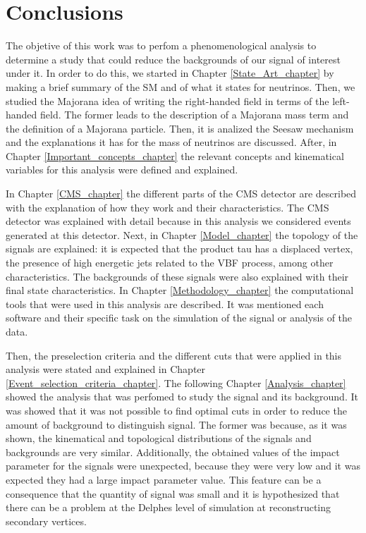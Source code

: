 \chapter{Conclusions} 
\label{Conclusion_chapter}

The objetive of this work was to perfom a phenomenological analysis to determine a study that could reduce the backgrounds of our signal of interest under it. In order to do this, we started in Chapter \ref{State_Art_chapter} by making a brief summary of the SM and of what it states for neutrinos. Then, we studied the Majorana idea of writing the right-handed field in terms of the left-handed field. The former leads to the description of a Majorana mass term and the definition of a Majorana particle. Then, it is analized the Seesaw mechanism and the explanations it has for the mass of neutrinos are discussed. After, in Chapter \ref{Important_concepts_chapter} the relevant concepts and kinematical variables for this analysis were defined and explained.

In Chapter \ref{CMS_chapter} the different parts of the CMS detector are described with the explanation of how they work and their characteristics. The CMS detector was explained with detail because in this analysis we considered events generated at this detector. Next, in Chapter \ref{Model_chapter} the topology of the signals are explained: it is expected that the product tau has a displaced vertex, the presence of high energetic jets related to the VBF process, among other characteristics. The backgrounds of these signals were also explained with their final state characteristics. In Chapter \ref{Methodology_chapter} the computational tools that were used in this analysis are described. It was mentioned each software and their specific task on the simulation of the signal or analysis of the data.  

Then, the preselection criteria and the different cuts that were applied in this analysis were stated and explained in Chapter \ref{Event_selection_criteria_chapter}. The following Chapter \ref{Analysis_chapter} showed the analysis that was perfomed to study the signal and its background. It was showed that it was not possible to find optimal cuts in order to reduce the amount of background to distinguish signal. The former was because, as it was shown, the kinematical and topological distributions of the signals and backgrounds are very similar.
Additionally, the obtained values of the impact parameter for the signals were unexpected, because they were very low and it was expected they had a large impact parameter value. This feature can be a consequence that the quantity of signal was small and it is hypothesized that there can be a problem at the Delphes level of simulation at reconstructing secondary vertices.


